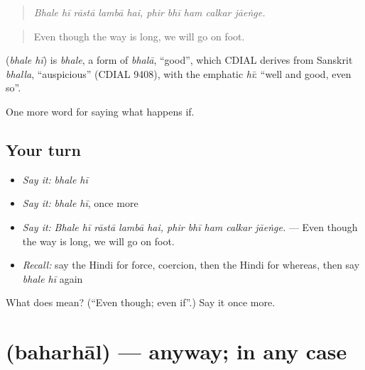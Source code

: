\begin{quote}
\emph{Bhale hī rāstā lambā hai, phir bhī ham calkar jāeṅge.}
\end{quote}

\begin{quote}
Even though the way is long, we will go on foot.
\end{quote}

\begin{cousinweb}
\textbf{ } (\emph{bhale hī}) is \emph{bhale}, a form of \emph{bhalā}, \textquotedblleft{}good\textquotedblright{}, which CDIAL derives from Sanskrit \emph{bhalla}, \textquotedblleft{}auspicious\textquotedblright{} (CDIAL 9408), with the emphatic \emph{hī}: \textquotedblleft{}well and good, even so\textquotedblright{}.
\end{cousinweb}

\begin{grammarlens}[title={What you've built}]
One more word for saying what happens if.
\end{grammarlens}

\subsection*{Your turn}
\begin{itemize}
\raggedright
  \item \emph{Say it:} \emph{bhale hī}
  \item \emph{Say it:} \emph{bhale hī}, once more
  \item \emph{Say it:} \emph{Bhale hī rāstā lambā hai, phir bhī ham calkar jāeṅge.} — Even though the way is long, we will go on foot.
  \item \emph{Recall:} say the Hindi for force, coercion, then the Hindi for whereas, then say \emph{bhale hī} again
\end{itemize}

\begin{tcolorbox}[breakable,colback=teal!4,colframe=teal!35!black,title={Before you move on}]
What does   mean? (\textquotedblleft{}Even though; even if\textquotedblright{}.) Say it once more.
\end{tcolorbox}
\section[\texorpdfstring{\hi{बहरहाल} (baharhāl)}{बहरहाल (baharhāl)}]{ (baharhāl) — anyway; in any case}

\label{lesson:HI-C552-baharhal}




